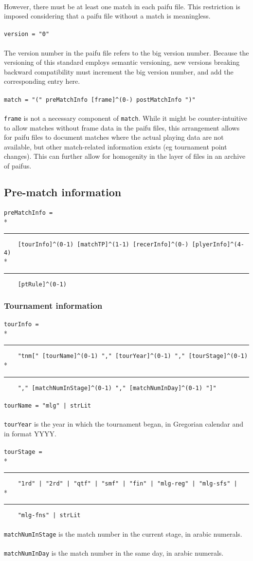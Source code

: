 \documentclass[%
	a4paper%
	,10pt%
	,twoside%
	,notitlepage%
]{article}%
\newcommand*{\ruleSymbol}{\textjapanese{⚠}}%
\newcommand*{\ruleMargin}{\marginpar{\flushright{}\ruleSymbol{}}}%
\newcommand*{\rulePar}{\paragraph*{\ruleMargin{}}}%
\newcommand*{\indentRule}{\rule{10pt}{0pt}}%
\begin{document}
	\paragraph*{}However, there must be at least one match in each paifu file. This restriction is imposed considering that a paifu file without a match is meaningless. %
	\rulePar{}\lstinline/version = "0"/%
	\paragraph*{}The version number in the paifu file refers to the big version number. Because the versioning of this standard employs semantic versioning, new versions breaking backward compatibility must increment the big version number, and add the corresponding entry here. %
	\rulePar{}\lstinline/match = "(" preMatchInfo [frame]^(0-) postMatchInfo ")"/%
	\paragraph*{}\lstinline/frame/ is not a necessary component of \lstinline/match/. While it might be counter-intuitive to allow matches without frame data in the paifu files, this arrangement allows for paifu files to document matches where the actual playing data are not available, but other match-related information exists (eg tournament point changes). This can further allow for homogenity in the layer of files in an archive of paifus. %
	\subsection{Pre-match information}%
		\rulePar{}\lstinline/preMatchInfo = /\\*%
		\indentRule{}\lstinline/    [tourInfo]^(0-1) [matchTP]^(1-1) [recerInfo]^(0-) [plyerInfo]^(4-4) /\\*%
		\indentRule{}\lstinline/    [ptRule]^(0-1)/%
		\subsubsection{Tournament information}%
			\rulePar{}\lstinline/tourInfo = /\\*%
			\indentRule{}\lstinline/    "tnm[" [tourName]^(0-1) "," [tourYear]^(0-1) "," [tourStage]^(0-1) /\\*%
			\indentRule{}\lstinline/    "," [matchNumInStage]^(0-1) "," [matchNumInDay]^(0-1) "]"/%
			\rulePar{}\lstinline/tourName = "mlg" | strLit/%
			\rulePar{}\lstinline/tourYear/ is the year in which the tournament began, in Gregorian calendar and in format YYYY. %
			\rulePar{}\lstinline/tourStage = /\\*%
			\indentRule{}\lstinline/    "1rd" | "2rd" | "qtf" | "smf" | "fin" | "mlg-reg" | "mlg-sfs" | /\\*%
			\indentRule{}\lstinline/    "mlg-fns" | strLit/%
			\rulePar{}\lstinline/matchNumInStage/ is the match number in the current stage, in arabic numerals. %
			\rulePar{}\lstinline/matchNumInDay/ is the match number in the same day, in arabic numerals. %
\end{document}

